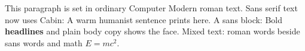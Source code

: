 \documentclass{article}
\begin{document}
This paragraph is set in ordinary Computer Modern roman text.
Sans serif text now uses Cabin: \textsf{A warm humanist sentence} prints here.
A sans block: {\sffamily Bold \textbf{headlines} and plain body copy} shows the face.
Mixed text: roman words beside \textsf{sans words} and math $E = mc^2$.
\end{document}

